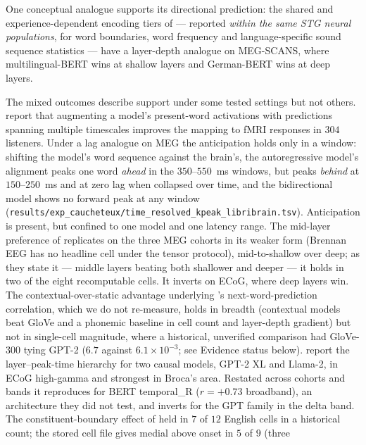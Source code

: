 \documentclass{article}
\begin{document}
One conceptual analogue supports its directional prediction: the shared and
experience-dependent encoding tiers of \citet{bhayagrossman2025stg} --- reported \emph{within the
same STG neural populations}, for word boundaries, word frequency and language-specific sound
sequence statistics --- have a layer-depth analogue on MEG-SCANS, where multilingual-BERT wins at
shallow layers and German-BERT wins at deep layers.

The mixed outcomes describe support under some tested settings but not others. \citet{caucheteux2023evidence} report that augmenting a model's present-word activations with
predictions spanning multiple timescales improves the mapping to fMRI responses in $304$ listeners.
Under a lag analogue on MEG the anticipation holds only in a window: shifting the model's word
sequence against the brain's, the
autoregressive model's alignment peaks one word \emph{ahead} in the $350$--$550$~ms windows, but
peaks \emph{behind} at $150$--$250$~ms and at zero lag when collapsed over time, and the
bidirectional model shows no forward peak at any window
(\texttt{results/exp\_caucheteux/\allowbreak time\_resolved\_kpeak\_libribrain.tsv}). Anticipation
is present, but confined to one model and one latency range. The mid-layer preference of
\citet{toneva2019interpreting} replicates on the three MEG cohorts in its weaker form (Brennan EEG has no headline cell under the tensor protocol),
mid-to-shallow over deep; as they state it --- middle layers beating both shallower and deeper ---
it holds in two of the eight recomputable cells. It inverts on ECoG, where deep layers win. The
contextual-over-static advantage underlying \citet{schrimpf2021neural}'s next-word-prediction
correlation, which we do not re-measure, holds in breadth
(contextual models beat GloVe and a phonemic baseline in cell count and
layer-depth gradient) but not in single-cell magnitude, where a historical, unverified comparison
had GloVe-300 \citep{pennington2014glove} tying GPT-2 ($6.7$ against $6.1\times10^{-3}$; see Evidence
status below). \citet{goldstein2025temporal} report the layer--peak-time hierarchy for two causal models,
GPT-2 XL and Llama-2, in ECoG high-gamma and strongest in Broca's area. Restated across cohorts and
bands it reproduces for BERT temporal\_R ($r = +0.73$ broadband), an architecture they did not
test, and inverts for the GPT family in the delta band. The
constituent-boundary effect of \citet{zou2026constituent} held in $7$ of $12$
English cells in a historical count; the stored cell file gives medial above onset in $5$ of $9$ (three
\end{document}
